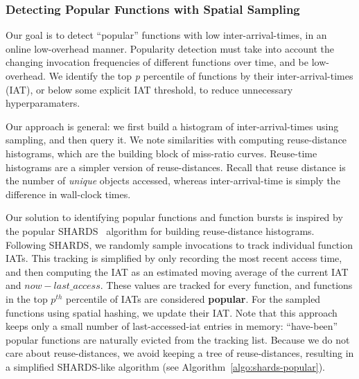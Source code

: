 \vspace*{-0.2cm}
\subsubsection{Detecting Popular Functions with Spatial Sampling}

Our goal is to detect ``popular'' functions with low inter-arrival-times, in an online low-overhead manner.
%
Popularity detection must take into account the changing invocation frequencies of different functions over time, and be low-overhead.
We identify the top \textit{p} percentile of functions by their inter-arrival-times (IAT), or below some explicit IAT threshold, to reduce unnecessary hyperparamaters. 

Our approach is general: we first build a histogram of inter-arrival-times using sampling, and then query it. 
We note similarities with computing reuse-distance histograms, which are the building block of miss-ratio curves. 
Reuse-time histograms are a simpler version of reuse-distances.
Recall that reuse distance is the number of \emph{unique} objects accessed, whereas inter-arrival-time is simply the difference in wall-clock times.



Our solution to identifying popular functions and function bursts is inspired by the popular SHARDS~\cite{shards} algorithm for building reuse-distance histograms. 
%
Following SHARDS, we randomly sample invocations to track individual function IATs. 
This tracking is simplified by only recording the most recent access time, and then computing the IAT as an estimated moving average of the current IAT and  $now - last\_access$. 
These values are tracked for every function, and functions in the top $p^{th}$ percentile of IATs are considered \textbf{popular}.
%
For the sampled functions using spatial hashing, we update their IAT.
Note that this approach keeps only a small number of last-accessed-iat entries in memory: ``have-been'' popular functions are naturally evicted from the tracking list. 
Because we do not care about reuse-distances, we avoid keeping a tree of reuse-distances, resulting in a simplified SHARDS-like algorithm (see Algorithm~\ref{algo:shards-popular}). 



